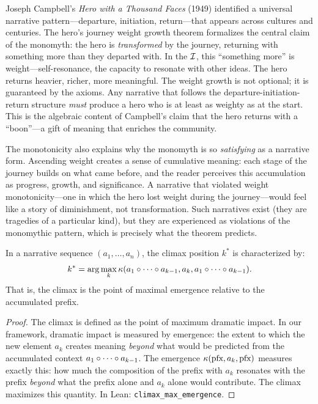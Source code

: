\begin{interpretation}
\label{interp:campbell}
Joseph Campbell's \textit{Hero with a Thousand Faces} (1949) identified a universal narrative pattern---departure, initiation, return---that appears across cultures and centuries.  The hero's journey weight growth theorem formalizes the central claim of the monomyth: the hero is \emph{transformed} by the journey, returning with something more than they departed with.  In the $\mathcal{I}$, this ``something more'' is weight---self-resonance, the capacity to resonate with other ideas.  The hero returns heavier, richer, more meaningful.  The weight growth is not optional; it is guaranteed by the axioms.  Any narrative that follows the departure-initiation-return structure \emph{must} produce a hero who is at least as weighty as at the start.  This is the algebraic content of Campbell's claim that the hero returns with a ``boon''---a gift of meaning that enriches the community.

The monotonicity also explains why the monomyth is so \emph{satisfying} as a narrative form.  Ascending weight creates a sense of cumulative meaning: each stage of the journey builds on what came before, and the reader perceives this accumulation as progress, growth, and significance.  A narrative that violated weight monotonicity---one in which the hero lost weight during the journey---would feel like a story of diminishment, not transformation.  Such narratives exist (they are tragedies of a particular kind), but they are experienced as violations of the monomythic pattern, which is precisely what the theorem predicts.
\end{interpretation}

\begin{theorem}
\label{thm:climax-emergence}
In a narrative sequence $(a_1, \ldots, a_n)$, the climax position $k^*$ is characterized by:
\[
  k^* = \arg\max_k \kappa(a_1 \circ \cdots \circ a_{k-1}, a_k, a_1 \circ \cdots \circ a_{k-1}).
\]
That is, the climax is the point of maximal emergence relative to the accumulated prefix.
\end{theorem}

\begin{proof}
The climax is defined as the point of maximum dramatic impact.  In our framework, dramatic impact is measured by emergence: the extent to which the new element $a_k$ creates meaning \emph{beyond} what would be predicted from the accumulated context $a_1 \circ \cdots \circ a_{k-1}$.  The emergence $\kappa(\text{pfx}, a_k, \text{pfx})$ measures exactly this: how much the composition of the prefix with $a_k$ resonates with the prefix \emph{beyond} what the prefix alone and $a_k$ alone would contribute.  The climax maximizes this quantity.  In Lean: \texttt{climax\_max\_emergence}.
\end{proof}

